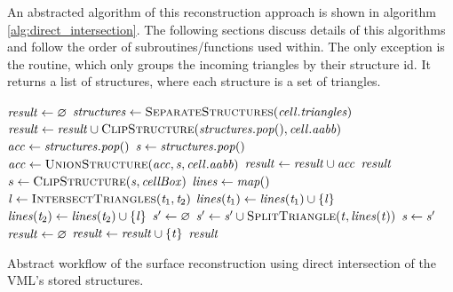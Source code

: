 An abstracted algorithm of this reconstruction approach is shown in algorithm \ref{alg:direct_intersection}.
The following sections discuss details of this algorithms and follow the order of subroutines/functions used within.
The only exception is the  routine, which only groups the incoming triangles by their structure id.
It returns a list of structures, where each structure is a set of triangles.

\begin{algorithm}
	\centering
	\begin{algorithmic}[1]
			\State $\mathit{result} \gets \varnothing$
					\State $\var{structures} \gets \Call{SeparateStructures}{\var{cell}.\var{triangles}}$
						\State $\var{result} \gets \var{result} \cup \Call{ClipStructure}{\var{structures}.\var{pop}(), \var{cell}.\var{aabb}}$
						\State $\mathit{acc} \gets \mathit{structures}.\mathit{pop}()$
							\State $\mathit{s} \gets \mathit{structures}.\mathit{pop}()$
							\State $\var{acc} \gets \Call{UnionStructure}{\var{acc}, \var{s}, \var{cell}.\var{aabb}}$
						\EndWhile
						\State $\mathit{result} \gets \mathit{result} \cup \mathit{acc}$
					\EndIf
				\EndIf
			\EndFor
			\State \Return $\mathit{result}$
		\EndFunction
		\\
				\State $s \gets \Call{ClipStructure}{\var{s}, \var{cellBox}}$
			\EndFor
			\State $\mathit{lines} \gets \mathit{map}()$ 
				\State $\var{l} \gets \Call{IntersectTriangles}{\var{t}_1, \var{t}_2}$
				 
					\State $\mathit{lines}(\mathit{t}_1) \gets \mathit{lines}(\mathit{t}_1) \cup \{\mathit{l}\}$
					\State $\mathit{lines}(\mathit{t}_2) \gets \mathit{lines}(\mathit{t}_2) \cup \{\mathit{l}\}$
				\EndIf
			\EndFor
				\State $\mathit{s'} \gets \varnothing$
					\State $\var{s'} \gets \var{s'} \cup \Call{SplitTriangle}{\var{t}, \var{lines}(\var{t})}$
				\EndFor
				\State $\mathit{s} \gets \mathit{s'}$
			\EndFor
			\State $\mathit{result} \gets \varnothing$
						\State $\mathit{result} \gets \mathit{result} \cup \{\mathit{t}\}$
					\EndIf
				\EndFor
			\EndFor
			\State \Return $\mathit{result}$
		\EndFunction
	\end{algorithmic}
	\caption{
		Abstract workflow of the surface reconstruction using direct intersection of the VML's stored structures.
	}
	\label{alg:direct_intersection}
\end{algorithm}


